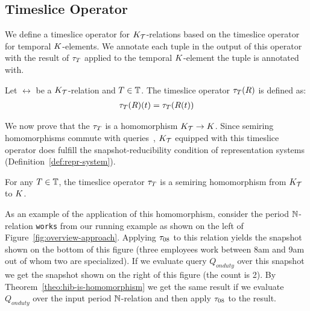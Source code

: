 \subsection{Timeslice Operator}
\label{sec:time-slic-repr}

We define a timeslice operator for $K_{\mathcal{T}}$-relations based on the timeslice operator for temporal $K$-elements. We annotate each tuple in the output of this operator with the result of  $\tau_{T}$ applied to the temporal $K$-element the tuple is annotated with.

\begin{defi}
  Let $\rel$ be a $K_{\mathcal{T}}$-relation and $T \in \mathbb{T}$. The timeslice operator $\tau_{T}(R)$ is defined as:
  \begin{align*}
    \tau_{T}(R)(t) = \tau_{T}(R(t))
  \end{align*}
\end{defi}

We now prove that the $\tau_{T}$ %
is a homomorphism  $K_{\mathcal{T}} \to K$. Since semiring homomorphisms commute with queries~\cite{GK07}, %
$K_{\mathcal{T}}$ equipped with this timeslice operator does fulfill the snapshot-reducibility condition of representation systems (Definition~\ref{def:repr-system}). %

\begin{theo}\label{theo:hib-is-homomorphism}
For any $T \in \mathbb{T}$, the timeslice operator $\tau_{T}$ is a semiring homomorphism from $K_{\mathcal{T}}$ to $K$.
\end{theo}

As an example of the application of this homomorphism, consider  the period ${\mathbb{N}}$-relation \texttt{works} from our running example as shown on the left of Figure~\ref{fig:overview-approach}. Applying $\tau_{08}$ to this relation yields the snapshot shown on the bottom of this figure (three employees work between 8am and 9am out of whom two are specialized). If we evaluate query $Q_{onduty}$ over this snapshot we get the snapshot shown on the right of this figure (the count is 2). By Theorem~\ref{theo:hib-is-homomorphism} we get the same result if we evaluate $Q_{onduty}$ over the input period ${\mathbb{N}}$-relation and then apply $\tau_{08}$ to the result.

